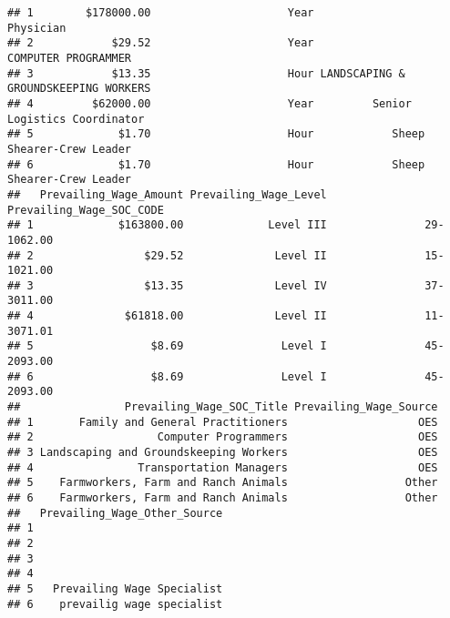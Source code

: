 \documentclass{article}\usepackage{graphicx, color}
\makeatletter
\newenvironment{kframe}{%
 \def\at@end@of@kframe{}%
 \ifinner\ifhmode%
  \def\at@end@of@kframe{\end{minipage}}%
  \begin{minipage}{\columnwidth}%
 \fi\fi%
 \def\FrameCommand##1{\hskip\@totalleftmargin \hskip-\fboxsep
 \colorbox{shadecolor}{##1}\hskip-\fboxsep
     \hskip-\linewidth \hskip-\@totalleftmargin \hskip\columnwidth}%
 \MakeFramed {\advance\hsize-\width
   \@totalleftmargin\z@ \linewidth\hsize
   \@setminipage}}%
 {\par\unskip\endMakeFramed%
 \at@end@of@kframe}
\newenvironment{knitrout}{}{} %
\makeatother
\begin{document}
\begin{knitrout}
\begin{kframe}
\begin{verbatim}
## 1        $178000.00                     Year                            Physician
## 2            $29.52                     Year                  COMPUTER PROGRAMMER
## 3            $13.35                     Hour LANDSCAPING & GROUNDSKEEPING WORKERS
## 4         $62000.00                     Year         Senior Logistics Coordinator
## 5             $1.70                     Hour            Sheep Shearer-Crew Leader
## 6             $1.70                     Hour            Sheep Shearer-Crew Leader
##   Prevailing_Wage_Amount Prevailing_Wage_Level Prevailing_Wage_SOC_CODE
## 1             $163800.00             Level III               29-1062.00
## 2                 $29.52              Level II               15-1021.00
## 3                 $13.35              Level IV               37-3011.00
## 4              $61818.00              Level II               11-3071.01
## 5                  $8.69               Level I               45-2093.00
## 6                  $8.69               Level I               45-2093.00
##                Prevailing_Wage_SOC_Title Prevailing_Wage_Source
## 1       Family and General Practitioners                    OES
## 2                   Computer Programmers                    OES
## 3 Landscaping and Groundskeeping Workers                    OES
## 4                Transportation Managers                    OES
## 5    Farmworkers, Farm and Ranch Animals                  Other
## 6    Farmworkers, Farm and Ranch Animals                  Other
##   Prevailing_Wage_Other_Source
## 1                             
## 2                             
## 3                             
## 4                             
## 5   Prevailing Wage Specialist
## 6    prevailig wage specialist
\end{verbatim}
\end{kframe}
\end{knitrout}
\end{document}

